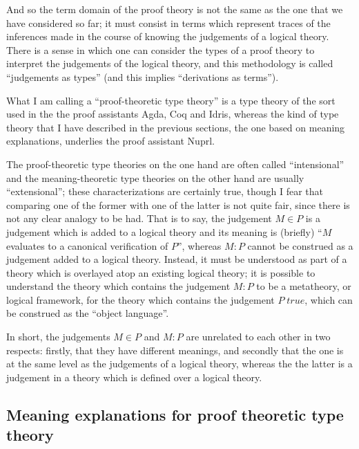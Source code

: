 \documentclass{amsart}
\theoremstyle{definition}
\theoremstyle{remark}
\numberwithin{equation}{section}
\newcommand\istrue[1]{\ensuremath{#1\;\mathit{true}}}
\newcommand\ver[2]{\ensuremath{#1\in#2}}
\begin{document}
And so the term domain of the proof theory is not the same as the one that we
have considered so far; it must consist in terms which represent traces of the
inferences made in the course of knowing the judgements of a logical theory.
There is a sense in which one can consider the types of a proof theory to
interpret the judgements of the logical theory, and this methodology is called
``judgements as types'' (and this implies ``derivations as terms'').

What I am calling a ``proof-theoretic type theory'' is a type theory of the
sort used in the the proof assistants Agda, Coq and Idris, whereas the kind of
type theory that I have described in the previous sections, the one based on
meaning explanations, underlies the proof assistant Nuprl.

The proof-theoretic type theories on the one hand are often called
``intensional'' and the meaning-theoretic type theories on the other hand are
usually ``extensional''; these characterizations are certainly true, though I
fear that comparing one of the former with one of the latter is not quite fair,
since there is not any clear analogy to be had. That is to say, the judgement
\ver{M}{P} is a judgement which is added to a logical theory and its meaning is
(briefly) ``$M$ evaluates to a canonical verification of $P$'', whereas $M:P$ cannot
be construed as a judgement added to a logical theory. Instead, it must be
understood as part of a theory which is overlayed atop an existing logical
theory; it is possible to understand the theory which contains the judgement
$M:P$ to be a metatheory, or logical framework, for the theory which contains
the judgement \istrue{P}, which can be construed as the ``object language''.

In short, the judgements \ver{M}{P} and $M:P$ are unrelated to each other in
two respects: firstly, that they have different meanings, and secondly that the
one is at the same level as the judgements of a logical theory, whereas the the
latter is a judgement in a theory which is defined over a logical theory.

\subsection{Meaning explanations for proof theoretic type theory}
\end{document}
